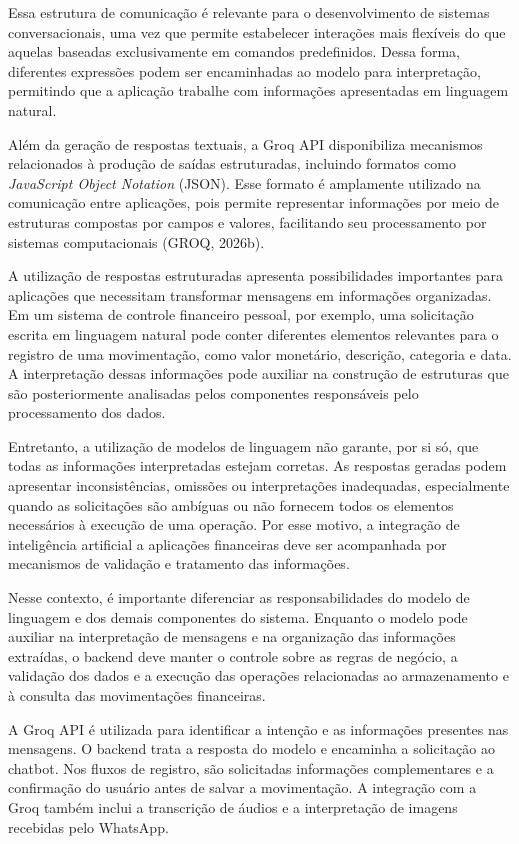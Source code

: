 Essa estrutura de comunicação é relevante para o desenvolvimento de sistemas conversacionais, uma vez que permite estabelecer interações mais flexíveis do que aquelas baseadas exclusivamente em comandos predefinidos. Dessa forma, diferentes expressões podem ser encaminhadas ao modelo para interpretação, permitindo que a aplicação trabalhe com informações apresentadas em linguagem natural.

Além da geração de respostas textuais, a Groq API disponibiliza mecanismos relacionados à produção de saídas estruturadas, incluindo formatos como \textit{JavaScript Object Notation} (JSON). Esse formato é amplamente utilizado na comunicação entre aplicações, pois permite representar informações por meio de estruturas compostas por campos e valores, facilitando seu processamento por sistemas computacionais (GROQ, 2026b).

A utilização de respostas estruturadas apresenta possibilidades importantes para aplicações que necessitam transformar mensagens em informações organizadas. Em um sistema de controle financeiro pessoal, por exemplo, uma solicitação escrita em linguagem natural pode conter diferentes elementos relevantes para o registro de uma movimentação, como valor monetário, descrição, categoria e data. A interpretação dessas informações pode auxiliar na construção de estruturas que são posteriormente analisadas pelos componentes responsáveis pelo processamento dos dados.

Entretanto, a utilização de modelos de linguagem não garante, por si só, que todas as informações interpretadas estejam corretas. As respostas geradas podem apresentar inconsistências, omissões ou interpretações inadequadas, especialmente quando as solicitações são ambíguas ou não fornecem todos os elementos necessários à execução de uma operação. Por esse motivo, a integração de inteligência artificial a aplicações financeiras deve ser acompanhada por mecanismos de validação e tratamento das informações.

Nesse contexto, é importante diferenciar as responsabilidades do modelo de linguagem e dos demais componentes do sistema. Enquanto o modelo pode auxiliar na interpretação de mensagens e na organização das informações extraídas, o backend deve manter o controle sobre as regras de negócio, a validação dos dados e a execução das operações relacionadas ao armazenamento e à consulta das movimentações financeiras.

A Groq API é utilizada para identificar a intenção e as informações presentes nas mensagens. O backend trata a resposta do modelo e encaminha a solicitação ao chatbot. Nos fluxos de registro, são solicitadas informações complementares e a confirmação do usuário antes de salvar a movimentação. A integração com a Groq também inclui a transcrição de áudios e a interpretação de imagens recebidas pelo WhatsApp.

